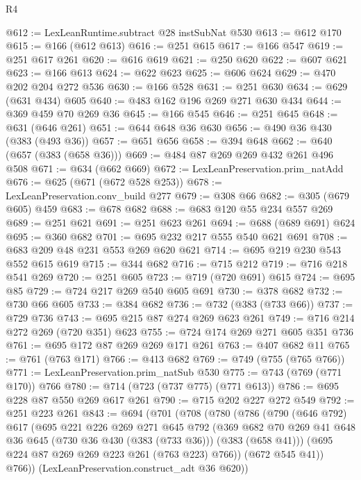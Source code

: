 \begin{lexlean}{R4}
\begin{coremodule}
{{{{{{{{{{{{{{@612 := LexLeanRuntime.subtract @28 instSubNat @530
@613 := @612 @170
@615 := @166 (@612 @613)
@616 := @251 @615
@617 := @166 @547
@619 := @251 @617 @261
@620 := @616 @619
@621 := @250 @620
@622 := @607 @621
@623 := @166 @613
@624 := @622 @623
@625 := @606 @624
@629 := @470 @202 @204 @272 @536
@630 := @166 @528
@631 := @251 @630
@634 := @629 (@631 @434) @605
@640 := @483 @162 @196 @269 @271 @630 @434
@644 := @369 @459 @70 @269 @36
@645 := @166 @545
@646 := @251 @645
@648 := @631 (@646 @261)
@651 := @644 @648 @36 @630
@656 := @490 @36 @430 (@383 (@493 @36))
@657 := @651 @656
@658 := @394 @648
@662 := @640 (@657 (@383 (@658 @36)))
@669 := @484 @87 @269 @269 @432 @261 @496 @508
@671 := @634 (@662 @669)
@672 := LexLeanPreservation.prim_natAdd
@676 := @625 (@671 (@672 @528 @253))
@678 := LexLeanPreservation.conv_build @277
@679 := @308 @66
@682 := @305 (@679 @605) @459
@683 := @678 @682
@688 := @683 @120 @55 @234 @557 @269
@689 := @251 @621
@691 := @251 @623 @261
@694 := @688 (@689 @691) @624
@695 := @360 @682
@701 := @695 @232 @217 @555 @540 @621 @691
@708 := @683 @209 @48 @231 @553 @269 @620 @621
@714 := @695 @219 @230 @543 @552 @615 @619
@715 := @344 @682
@716 := @715 @212
@719 := @716 @218 @541 @269
@720 := @251 @605
@723 := @719 (@720 @691) @615
@724 := @695 @85
@729 := @724 @217 @269 @540 @605 @691
@730 := @378 @682
@732 := @730 @66 @605
@733 := @384 @682
@736 := @732 (@383 (@733 @66))
@737 := @729 @736
@743 := @695 @215 @87 @274 @269 @623 @261
@749 := @716 @214 @272 @269 (@720 @351) @623
@755 := @724 @174 @269 @271 @605 @351 @736
@761 := @695 @172 @87 @269 @269 @171 @261
@763 := @407 @682 @11
@765 := @761 (@763 @171)
@766 := @413 @682
@769 := @749 (@755 (@765 @766))
@771 := LexLeanPreservation.prim_natSub @530
@775 := @743 (@769 (@771 @170)) @766
@780 := @714 (@723 (@737 @775) (@771 @613))
@786 := @695 @228 @87 @550 @269 @617 @261
@790 := @715 @202 @227 @272 @549
@792 := @251 @223 @261
@843 := @694
    (@701
      (@708
        (@780
          (@786
            (@790
              (@646 @792)
              @617
              (@695
                @221
                @226
                @269
                @271
                @645
                @792
                (@369
                  @682
                  @70
                  @269
                  @41
                  @648
                  @36
                  @645
                  (@730 @36 @430 (@383 (@733 @36)))
                  (@383 (@658 @41)))
                (@695 @224 @87 @269 @269 @223 @261 (@763 @223) @766))
              (@672 @545 @41))
            @766))
        (LexLeanPreservation.construct_adt @36 @620))
}}}}}}}}}}}}}}
\end{coremodule}
\end{lexlean}
